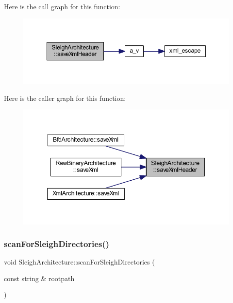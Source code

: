 Here is the call graph for this function\+:
\nopagebreak
\begin{figure}[H]
\begin{center}
\leavevmode
\includegraphics[width=348pt]{class_sleigh_architecture_a0ac133adbc1162fe2baeba1c897dfc34_cgraph}
\end{center}
\end{figure}
Here is the caller graph for this function\+:
\nopagebreak
\begin{figure}[H]
\begin{center}
\leavevmode
\includegraphics[width=338pt]{class_sleigh_architecture_a0ac133adbc1162fe2baeba1c897dfc34_icgraph}
\end{center}
\end{figure}
\mbox{\label{class_sleigh_architecture_a192dd872ccfe2a7f7a3ad18709fa37aa}} 
\subsubsection{\texorpdfstring{scanForSleighDirectories()}{scanForSleighDirectories()}}
{\footnotesize\ttfamily void Sleigh\+Architecture\+::scan\+For\+Sleigh\+Directories (\begin{DoxyParamCaption}\item[{const string \&}]{rootpath }\end{DoxyParamCaption})\hspace{0.3cm}{\ttfamily [static]}}



